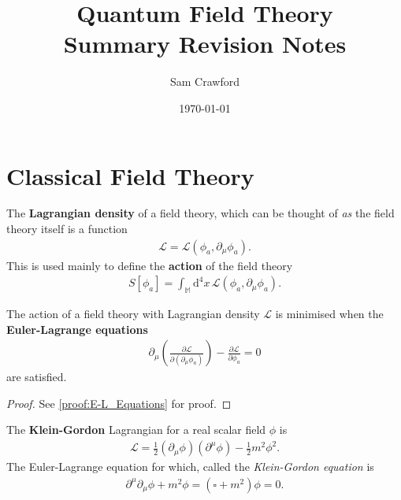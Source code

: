\documentclass[12pt]{article}
\title{Quantum Field Theory\\
\Large{Summary Revision Notes}}
\author{Sam Crawford}
\date{\today}
\begin{document}
\maketitle

\tableofcontents
\pagebreak

\section{Classical Field Theory}

\begin{definition}
	The \textbf{Lagrangian density} of a field theory, which can be thought of \textit{as} the field theory itself is a function
		\begin{align}
			\mathcal{L} = \mathcal{L}(\phi_a, \partial_\mu \phi_a).
		\end{align}
	This is used mainly to define the \textbf{action} of the field theory
		\begin{align}
			S[\phi_a] = \int_\mathbb{M} \mathrm{d}^4 x \, \mathcal{L}(\phi_a, \partial_\mu \phi_a).
		\end{align}
\end{definition}

\begin{prop}\label{prop:E-L_Equations}
	The action of a field theory with Lagrangian density $\mathcal{L}$ is minimised when the \textbf{Euler-Lagrange equations}
		\begin{align}
			\partial_\mu \left( \frac{\partial \mathcal{L}}{\partial (\partial_\mu \phi_a)} \right) - \frac{\partial \mathcal{L}}{\partial \phi_a} = 0
		\end{align}
	are satisfied.
\end{prop}
\begin{proof}
	See \cref{proof:E-L_Equations} for proof.
\end{proof}

\begin{example}
	The \textbf{Klein-Gordon} Lagrangian for a real scalar field $\phi$ is
		\begin{align}
			\mathcal{L} = \tfrac{1}{2} (\partial_\mu \phi) (\partial^\mu \phi) - \tfrac{1}{2} m^2 \phi^2.
		\end{align}
	The Euler-Lagrange equation for which, called the \textit{Klein-Gordon equation} is
		\begin{align}
			\partial^\mu \partial_\mu \phi + m^2 \phi = (\square + m^2) \phi = 0.
		\end{align}
\end{example}
\end{document}
